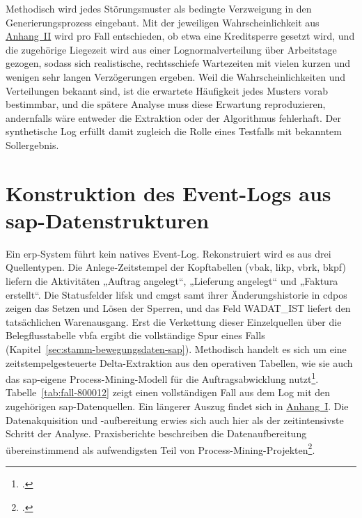 Methodisch wird jedes Störungsmuster als bedingte Verzweigung in den Generierungsprozess eingebaut. Mit der jeweiligen Wahrscheinlichkeit aus \hyperref[anh:parameter]{Anhang~II} wird pro Fall entschieden, ob etwa eine Kreditsperre gesetzt wird, und die zugehörige Liegezeit wird aus einer Lognormalverteilung über Arbeitstage gezogen, sodass sich realistische, rechtsschiefe Wartezeiten mit vielen kurzen und wenigen sehr langen Verzögerungen ergeben. Weil die Wahrscheinlichkeiten und Verteilungen bekannt sind, ist die erwartete Häufigkeit jedes Musters vorab bestimmbar, und die spätere Analyse muss diese Erwartung reproduzieren, andernfalls wäre entweder die Extraktion oder der Algorithmus fehlerhaft. Der synthetische Log erfüllt damit zugleich die Rolle eines Testfalls mit bekanntem Sollergebnis.

\section{Konstruktion des Event-Logs aus \gls{sap}-Datenstrukturen}\label{sec:logkonstruktion}

Ein \gls{erp}-System führt kein natives Event-Log. Rekonstruiert wird es aus drei Quellentypen. Die Anlege-Zeitstempel der Kopftabellen (\gls{vbak}, \gls{likp}, \gls{vbrk}, \gls{bkpf}) liefern die Aktivitäten „Auftrag angelegt“, „Lieferung angelegt“ und „Faktura erstellt“. Die Statusfelder \gls{lifsk} und \gls{cmgst} samt ihrer Änderungshistorie in \gls{cdpos} zeigen das Setzen und Lösen der Sperren, und das Feld WADAT\_IST liefert den tatsächlichen Warenausgang. Erst die Verkettung dieser Einzelquellen über die Belegflusstabelle \gls{vbfa} ergibt die vollständige Spur eines Falls (Kapitel~\ref{sec:stamm-bewegungsdaten-sap}). Methodisch handelt es sich um eine zeitstempelgesteuerte Delta-Extraktion aus den operativen Tabellen, wie sie auch das \gls{sap}-eigene Process-Mining-Modell für die Auftragsabwicklung nutzt\footcite[Vgl.][Abschnitt~3.1, S.~9--18]{sap2022samplecontent}. Tabelle~\ref{tab:fall-800012} zeigt einen vollständigen Fall aus dem Log mit den zugehörigen \gls{sap}-Datenquellen. Ein längerer Auszug findet sich in \hyperref[anh:eventlog]{Anhang~I}. Die Datenakquisition und -aufbereitung erwies sich auch hier als der zeitintensivste Schritt der Analyse. Praxisberichte beschreiben die Datenaufbereitung übereinstimmend als aufwendigsten Teil von Process-Mining-Projekten\footcite[Vgl.][S.~3 ff.]{reinkemeyer2020processmining}.

